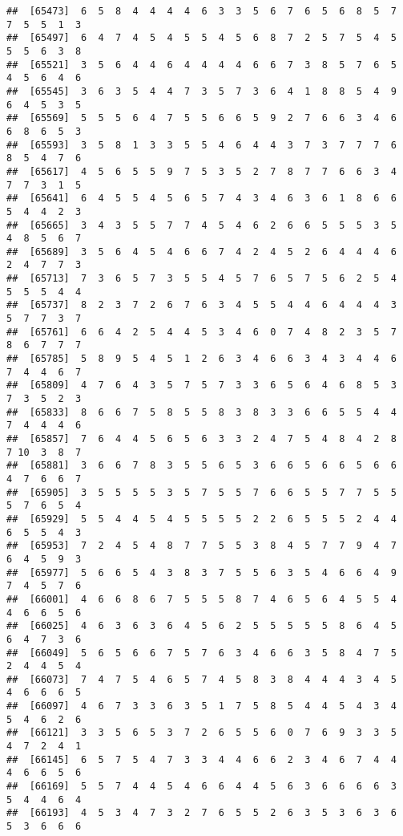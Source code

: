 \documentclass[
]{book}
\begin{document}
\begin{verbatim}
##  [65473]  6  5  8  4  4  4  4  6  3  3  5  6  7  6  5  6  8  5  7  7  5  5  1  3
##  [65497]  6  4  7  4  5  4  5  5  4  5  6  8  7  2  5  7  5  4  5  5  5  6  3  8
##  [65521]  3  5  6  4  4  6  4  4  4  4  6  6  7  3  8  5  7  6  5  4  5  6  4  6
##  [65545]  3  6  3  5  4  4  7  3  5  7  3  6  4  1  8  8  5  4  9  6  4  5  3  5
##  [65569]  5  5  5  6  4  7  5  5  6  6  5  9  2  7  6  6  3  4  6  6  8  6  5  3
##  [65593]  3  5  8  1  3  3  5  5  4  6  4  4  3  7  3  7  7  7  6  8  5  4  7  6
##  [65617]  4  5  6  5  5  9  7  5  3  5  2  7  8  7  7  6  6  3  4  7  7  3  1  5
##  [65641]  6  4  5  5  4  5  6  5  7  4  3  4  6  3  6  1  8  6  6  5  4  4  2  3
##  [65665]  3  4  3  5  5  7  7  4  5  4  6  2  6  6  5  5  5  3  5  4  8  5  6  7
##  [65689]  3  5  6  4  5  4  6  6  7  4  2  4  5  2  6  4  4  4  6  2  4  7  7  3
##  [65713]  7  3  6  5  7  3  5  5  4  5  7  6  5  7  5  6  2  5  4  5  5  5  4  4
##  [65737]  8  2  3  7  2  6  7  6  3  4  5  5  4  4  6  4  4  4  3  5  7  7  3  7
##  [65761]  6  6  4  2  5  4  4  5  3  4  6  0  7  4  8  2  3  5  7  8  6  7  7  7
##  [65785]  5  8  9  5  4  5  1  2  6  3  4  6  6  3  4  3  4  4  6  7  4  4  6  7
##  [65809]  4  7  6  4  3  5  7  5  7  3  3  6  5  6  4  6  8  5  3  7  3  5  2  3
##  [65833]  8  6  6  7  5  8  5  5  8  3  8  3  3  6  6  5  5  4  4  7  4  4  4  6
##  [65857]  7  6  4  4  5  6  5  6  3  3  2  4  7  5  4  8  4  2  8  7 10  3  8  7
##  [65881]  3  6  6  7  8  3  5  5  6  5  3  6  6  5  6  6  5  6  6  4  7  6  6  7
##  [65905]  3  5  5  5  5  3  5  7  5  5  7  6  6  5  5  7  7  5  5  5  7  6  5  4
##  [65929]  5  5  4  4  5  4  5  5  5  5  2  2  6  5  5  5  2  4  4  6  5  5  4  3
##  [65953]  7  2  4  5  4  8  7  7  5  5  3  8  4  5  7  7  9  4  7  6  4  5  9  3
##  [65977]  5  6  6  5  4  3  8  3  7  5  5  6  3  5  4  6  6  4  9  7  4  5  7  6
##  [66001]  4  6  6  8  6  7  5  5  5  8  7  4  6  5  6  4  5  5  4  4  6  6  5  6
##  [66025]  4  6  3  6  3  6  4  5  6  2  5  5  5  5  5  8  6  4  5  6  4  7  3  6
##  [66049]  5  6  5  6  6  7  5  7  6  3  4  6  6  3  5  8  4  7  5  2  4  4  5  4
##  [66073]  7  4  7  5  4  6  5  7  4  5  8  3  8  4  4  4  3  4  5  4  6  6  6  5
##  [66097]  4  6  7  3  3  6  3  5  1  7  5  8  5  4  4  5  4  3  4  5  4  6  2  6
##  [66121]  3  3  5  6  5  3  7  2  6  5  5  6  0  7  6  9  3  3  5  4  7  2  4  1
##  [66145]  6  5  7  5  4  7  3  3  4  4  6  6  2  3  4  6  7  4  4  4  6  6  5  6
##  [66169]  5  5  7  4  4  5  4  6  6  4  4  5  6  3  6  6  6  6  3  5  4  4  6  4
##  [66193]  4  5  3  4  7  3  2  7  6  5  5  2  6  3  5  3  6  3  6  5  3  6  6  6

\end{verbatim}
\end{document}
